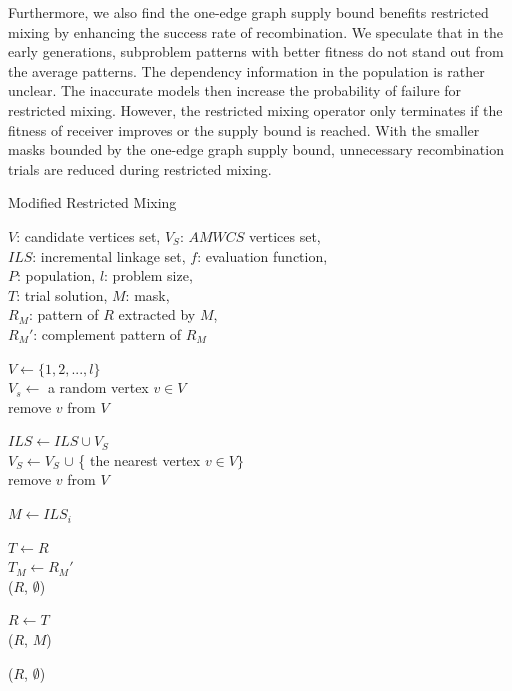 \documentclass{sig-alternate-05-2015}
\begin{document}
Furthermore, we also find the one-edge graph supply bound benefits restricted mixing by enhancing the success rate of recombination. We speculate that in the early generations, subproblem patterns with better fitness do not stand out from the average patterns. The dependency information in the population is rather unclear. The inaccurate models then increase the probability of failure for restricted mixing. However, the restricted mixing operator only terminates if the fitness of receiver improves or the supply bound is reached. With the smaller masks bounded by the one-edge graph supply bound, unnecessary recombination trials are reduced during restricted mixing. 


\begin{algorithm}
\caption{Modified Restricted Mixing}\label{algo_disjdecomp}

$V$: candidate vertices set, $V_S$: $AMWCS$ vertices set,  \\
$ILS$: incremental linkage set, $f$: evaluation function, \\
$P$: population, $l$: problem size, \\
$T$: trial solution, $M$: mask, \\
${R_M}$: pattern of $R$ extracted by $M$, \\
${R_M}'$: complement pattern of ${R_M}$


\BlankLine
$V \leftarrow \{ 1, 2, ..., l \}$ \\
$V_s \leftarrow$ a random vertex $v \in V$ \\
remove $v$ from $V$ \\

 {

    $ILS \leftarrow ILS \cup V_{S}$ \\
    $V_S \leftarrow V_S$ $\cup$ \{ the nearest vertex $v \in V \}$ \\
    remove $v$ from $V$ \\
}

\BlankLine
{} {

    $M \leftarrow ILS_i$ \\

     {

        $T \leftarrow R$ \\
        $T_M \leftarrow {R_M}'$ \\

         {
            \Return ($R$, $\emptyset$) 
        }

         {
            $R \leftarrow T$ \\
            \Return ($R$, $M$)
        }
    }
}
\Return ($R$, $\emptyset$) 
\end{algorithm}
\end{document}
